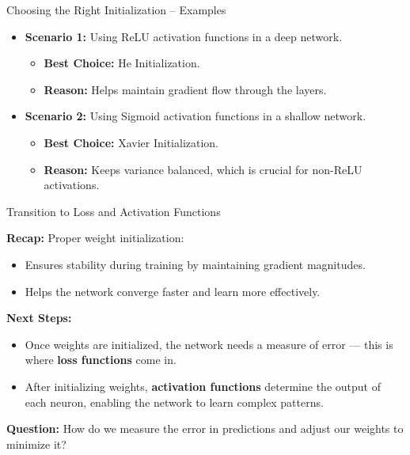 \documentclass[serif, aspectratio=169]{beamer}
\begin{document}
\begin{frame}{Choosing the Right Initialization – Examples}

    \begin{itemize}
        \item \textbf{Scenario 1:} Using ReLU activation functions in a deep network.
        \begin{itemize}
            \item \textbf{Best Choice:} He Initialization.
            \item \textbf{Reason:} Helps maintain gradient flow through the layers.
        \end{itemize}
        
        \item \textbf{Scenario 2:} Using Sigmoid activation functions in a shallow network.
        \begin{itemize}
            \item \textbf{Best Choice:} Xavier Initialization.
            \item \textbf{Reason:} Keeps variance balanced, which is crucial for non-ReLU activations.
        \end{itemize}
    
    \end{itemize}
    
\end{frame}

\begin{frame}{Transition to Loss and Activation Functions}

    \textbf{Recap:} Proper weight initialization:
    \begin{itemize}
        \item Ensures stability during training by maintaining gradient magnitudes.
        \item Helps the network converge faster and learn more effectively.
    \end{itemize}
    
    \textbf{Next Steps:}
    \begin{itemize}
        \item Once weights are initialized, the network needs a measure of error — this is where \textbf{loss functions} come in.
        \item After initializing weights, \textbf{activation functions} determine the output of each neuron, enabling the network to learn complex patterns.
    \end{itemize}
    
    \textbf{Question:} How do we measure the error in predictions and adjust our weights to minimize it?
    
\end{frame}
\end{document}
